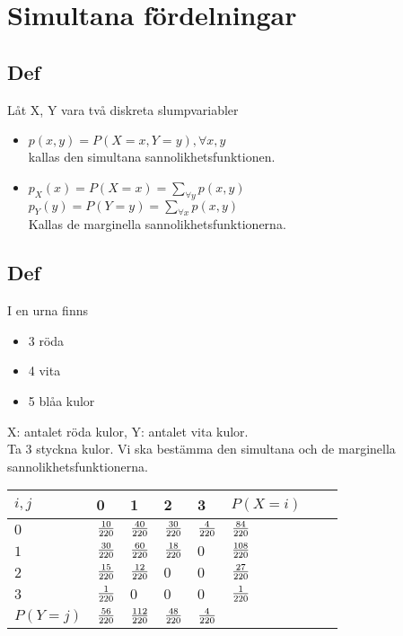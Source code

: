 \documentclass{article}
\begin{document}
\section{Simultana fördelningar}
\subsection{Def}
Låt X, Y vara två diskreta slumpvariabler
\begin{itemize}
  \item $ p(x,y) = P(X=x, Y=y), \forall x,y $\\
    kallas den simultana sannolikhetsfunktionen.
  \item $ p_X(x) = P(X=x) = \sum_{\forall y}p(x,y) $\\
        $ p_Y(y) = P(Y=y) = \sum_{\forall x}p(x,y) $\\
        Kallas de marginella sannolikhetsfunktionerna.
\end{itemize}

\subsection{Def}
I en urna finns

\begin{itemize}
  \item 3 röda
  \item 4 vita
  \item 5 blåa kulor
\end{itemize}

X: antalet röda kulor, Y: antalet vita kulor.\\
Ta 3 styckna kulor.
Vi ska bestämma den simultana och de marginella sannolikhetsfunktionerna.\\
\begin{tabular}{ l | l l l l l l l }
  $i,j$       & 0 & 1 & 2 & 3 & $P(X=i)$ & \\\hline
  $0$         &$ \frac{10}{220} $&$ \frac{40}{220} $&$ \frac{30}{220} $&$ \frac{4}{220} $&$ \frac{84}{220} $& \\
  $1$         &$ \frac{30}{220} $&$ \frac{60}{220} $&$ \frac{18}{220} $&$ 0 $&$ \frac{108}{220} $& \\
  $2$         &$ \frac{15}{220} $&$ \frac{12}{220}  $&$ 0 $&$ 0 $&$ \frac{27}{220} $& \\
  $3$         &$ \frac{1}{220} $&$ 0 $&$ 0 $&$ 0 $&$ \frac{1}{220} $& \\
  $P(Y=j)$    &$ \frac{56}{220} $&$ \frac{112}{220} $&$ \frac{48}{220} $&$ \frac{4}{220} $&  & \\
\end{tabular}
\end{document}
